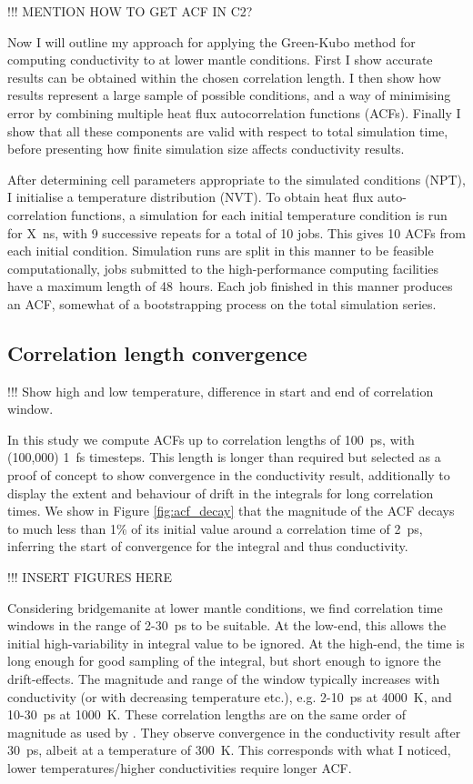 !!! MENTION HOW TO GET ACF IN C2?

Now I will outline my approach for applying the Green-Kubo method for computing conductivity to \bdgs at lower mantle conditions. First I show accurate results can be obtained within the chosen correlation length. I then show how results represent a large sample of possible conditions, and a way of minimising error by combining multiple heat flux autocorrelation functions (ACFs). Finally I show that all these components are valid with respect to total simulation time, before presenting how finite simulation size affects conductivity results.

After determining cell parameters appropriate to the simulated conditions (NPT), I initialise a temperature distribution (NVT). To obtain heat flux auto-correlation functions, a simulation for each initial temperature condition is run for X~ns, with 9 successive repeats for a total of 10 jobs. This gives 10 ACFs from each initial condition. Simulation runs are split in this manner to be feasible computationally, jobs submitted to the high-performance computing facilities have a maximum length of 48~hours. Each job finished in this manner produces an ACF, somewhat of a bootstrapping process on the total simulation series.

\subsection{\label{sec:3.GK.cor}Correlation length convergence}

!!! Show high and low temperature, difference in start and end of correlation window.

In this study we compute ACFs up to correlation lengths of 100~ps, with (100,000) 1~fs timesteps. This length is longer than required but selected as a proof of concept to show convergence in the conductivity result, additionally to display the extent and behaviour of drift in the integrals for long correlation times. We show in Figure \ref{fig:acf_decay} that the magnitude of the ACF decays to much less than 1\% of its initial value around a correlation time of 2~ps, inferring the start of convergence for the integral and thus conductivity.

!!! INSERT FIGURES HERE

Considering bridgemanite at lower mantle conditions, we find correlation time windows in the range of 2-30~ps to be suitable. At the low-end, this allows the initial high-variability in integral value to be ignored. At the high-end, the time is long enough for good sampling of the integral, but short enough to ignore the drift-effects. The magnitude and range of the window typically increases with conductivity (or with decreasing temperature etc.), e.g. 2-10~ps at 4000~K, and 10-30~ps at 1000~K. These correlation lengths are on the same order of magnitude as used by \citet{Haigis2012}. They observe convergence in the conductivity result after 30~ps, albeit at a temperature of 300~K. This corresponds with what I noticed, lower temperatures/higher conductivities require longer ACF.


